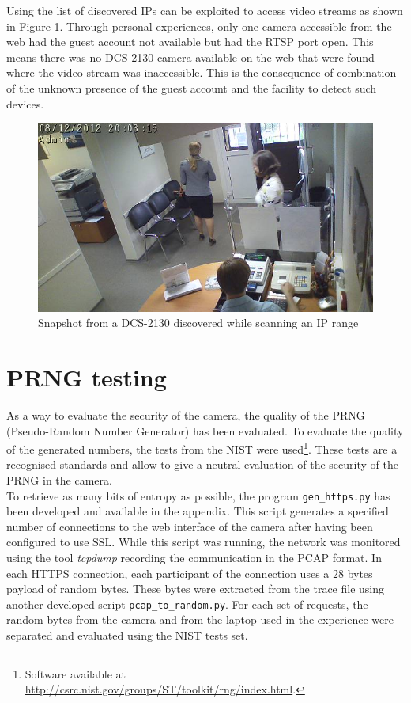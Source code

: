 Using the list of discovered IPs can be exploited to access video streams as shown in Figure \ref{fig:cam-snapshot}.
Through personal experiences, only one camera accessible from the web had the guest account not available but had the RTSP port open.
This means there was no DCS-2130 camera available on the web that were found where the video stream was inaccessible.
This is the consequence of combination of the unknown presence of the guest account and the facility to detect such devices.

\begin{figure}[h]
  \centering
  \includegraphics[width=13cm]{images/dms2.jpg}
  \caption{Snapshot from a DCS-2130 discovered while scanning an IP range}
  \label{fig:cam-snapshot}
\end{figure}

\section{PRNG testing}
\label{sec:dcs-random}

As a way to evaluate the security of the camera, the quality of the PRNG (Pseudo-Random Number Generator) has been evaluated.
To evaluate the quality of the generated numbers, the tests from the NIST were used\footnote{Software available at \url{http://csrc.nist.gov/groups/ST/toolkit/rng/index.html}.}.
These tests are a recognised standards and allow to give a neutral evaluation of the security of the PRNG in the camera.\\

To retrieve as many bits of entropy as possible, the program \texttt{gen\_https.py} has been developed and available in the appendix.
This script generates a specified number of connections to the web interface of the camera after having been configured to use SSL.
While this script was running, the network was monitored using the tool \emph{tcpdump} recording the communication in the PCAP format.
In each HTTPS connection, each participant of the connection uses a 28 bytes payload of random bytes.
These bytes were extracted from the trace file using another developed script \texttt{pcap\_to\_random.py}.
For each set of requests, the random bytes from the camera and from the laptop used in the experience were separated and evaluated using the NIST tests set.\\

